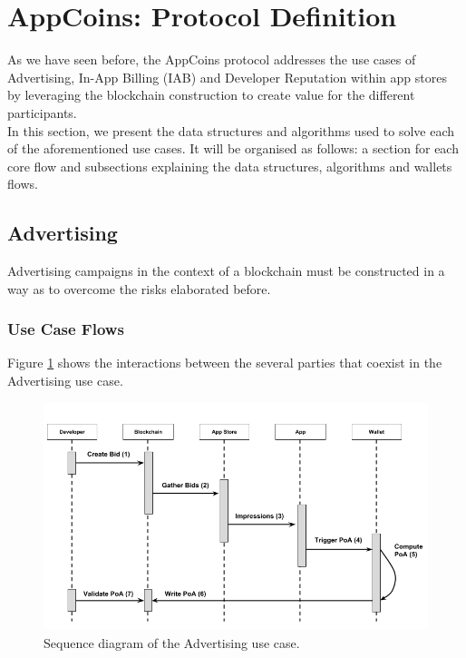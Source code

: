 \section{AppCoins: Protocol Definition}
\label{sec:protocol}

As we have seen before, the AppCoins protocol addresses the use cases of Advertising, In-App Billing (IAB) and Developer Reputation within app stores by leveraging the blockchain construction to create value for the different participants.\\

In this section, we present the data structures and algorithms used to solve each of the aforementioned use cases. It will be organised as follows: a section for each core flow and subsections explaining the data structures, algorithms and wallets flows.

\subsection{Advertising}

Advertising campaigns in the context of a blockchain must be constructed in a way as to overcome the risks elaborated before.

\subsubsection{Use Case Flows}

Figure \ref{fig:ads_sequence_diagram} shows the interactions between the several parties that coexist in the Advertising use case.

\begin{figure}[!ht]
\centering
\includegraphics[width=\textwidth]{diagrams/ads_sequence_diagram.png}
\caption{Sequence diagram of the Advertising use case.}
\label{fig:ads_sequence_diagram}
\end{figure}

